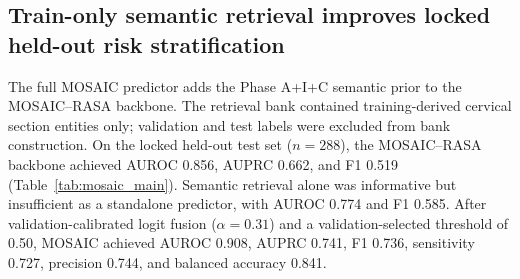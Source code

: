 \begin{table}[!htbp]
  \centering
  \caption{Report-supervision scarcity curve using a lightweight downstream surrogate.}
  \label{tab:scarcity_curve}
  \scriptsize
  \begin{threeparttable}
  \end{threeparttable}
\end{table}

\FloatBarrier

\subsection{Train-only semantic retrieval improves locked held-out risk stratification}
\label{subsec:mosaic_main_results}

The full MOSAIC predictor adds the Phase A+I+C semantic prior to the MOSAIC--RASA backbone. The retrieval bank contained training-derived cervical section entities only; validation and test labels were excluded from bank construction. On the locked held-out test set (\(n=288\)), the MOSAIC--RASA backbone achieved AUROC 0.856, AUPRC 0.662, and F1 0.519 (Table~\ref{tab:mosaic_main}). Semantic retrieval alone was informative but insufficient as a standalone predictor, with AUROC 0.774 and F1 0.585. After validation-calibrated logit fusion (\(\alpha=0.31\)) and a validation-selected threshold of 0.50, MOSAIC achieved AUROC 0.908, AUPRC 0.741, F1 0.736, sensitivity 0.727, precision 0.744, and balanced accuracy 0.841.

